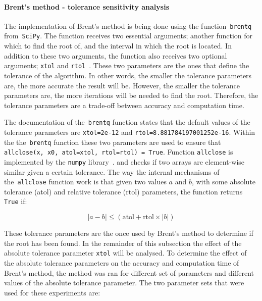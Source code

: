 \paragraph{Brent's method - tolerance sensitivity analysis}
\label{sec:brent_tolerance}

The implementation of Brent's method is being done using the
function~\lstinline[style=pystyle]{brentq}
from~\lstinline[style=pystyle]{SciPy}.
The function receives two essential arguments; another function for
which to find the root of, and the interval in which the root is located.
In addition to these two arguments, the function also receives two optional
arguments; \lstinline[style=pystyle]{xtol} and
\lstinline[style=pystyle]{rtol}~\cite{2020SciPy-NMeth}.
These two parameters are the ones that define the tolerance of the algorithm.
In other words, the smaller the tolerance parameters are, the more accurate
the result will be.
However, the smaller the tolerance parameters are, the more iterations will
be needed to find the root.
Therefore, the tolerance parameters are a trade-off between accuracy and
computation time.

The documentation of the~\lstinline[style=pystyle]{brentq} function states
that the default values of the tolerance parameters are
\lstinline[style=pystyle]{xtol=2e-12} and
\lstinline[style=pystyle]{rtol=8.881784197001252e-16}.
Within the the~\lstinline[style=pystyle]{brentq} function these two parameters
are used to ensure that
\lstinline[style=pystyle]{allclose(x, x0, atol=xtol, rtol=rtol) = True}.
Function \lstinline[style=pystyle]{allclose} is implemented by the
\lstinline[style=pystyle]{numpy} library~\cite{harris2020array}.
and checks if two arrays are element-wise similar given a certain tolerance.
The way the internal mechanisms of the~\lstinline[style=pystyle]{allclose}
function work is that given two values \(a\) and \(b\), with some absolute
tolerance (atol) and relative tolerance (rtol) parameters, the function returns
\lstinline[style=pystyle]{True} if:

\begin{equation}
    |a - b| \leq (\text{atol} + \text{rtol} \times |b|)
\end{equation}

These tolerance parameters are the once used by Brent's method to determine
if the root has been found.
In the remainder of this subsection the effect of the absolute tolerance
parameter \lstinline[style=pystyle]{xtol} will be analysed.
To determine the effect of the absolute tolerance parameters on the accuracy and
computation time of Brent's method, the method was ran for different set of
parameters and different values of the absolute tolerance parameter.
The two parameter sets that were used for these experiments are:

